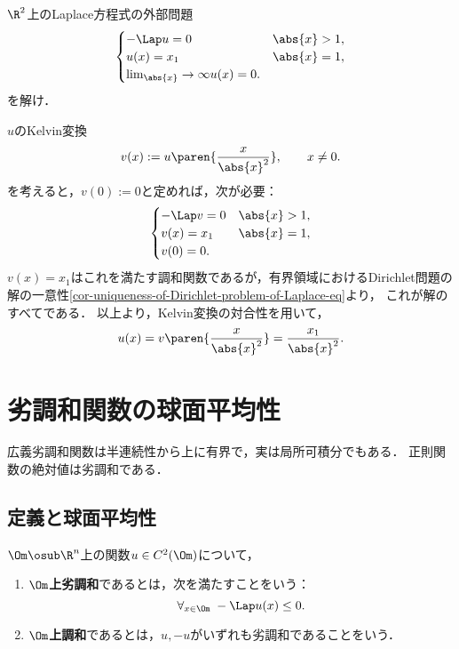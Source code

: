 \documentclass[uplatex,dvipdfmx]{jsreport}
\begin{document}
\begin{problem}
    $\R^2$上のLaplace方程式の外部問題
    \[\begin{cases}
        -\Lap u=0&\abs{x}>1,\\
        u(x)=x_1&\abs{x}=1,\\
        \lim_{\abs{x}}\to\infty u(x)=0.
    \end{cases}\]
    を解け．
\end{problem}
\begin{Proof}
    $u$のKelvin変換
    \[v(x):=u\paren{\frac{x}{\abs{x}^2}},\qquad x\ne0.\]
    を考えると，$v(0):=0$と定めれば，次が必要：
    \[\begin{cases}
        -\Lap v=0&\abs{x}>1,\\
        v(x)=x_1&\abs{x}=1,\\
        v(0)=0.
    \end{cases}\]
    $v(x)=x_1$はこれを満たす調和関数であるが，有界領域におけるDirichlet問題の解の一意性\ref{cor-uniqueness-of-Dirichlet-problem-of-Laplace-eq}より，
    これが解のすべてである．
    以上より，Kelvin変換の対合性を用いて，
    \[u(x)=v\paren{\frac{x}{\abs{x}^2}}=\frac{x_1}{\abs{x}^2}.\]
\end{Proof}

\section{劣調和関数の球面平均性}

\begin{tcolorbox}[colframe=ForestGreen, colback=ForestGreen!10!white,breakable,colbacktitle=ForestGreen!40!white,coltitle=black,fonttitle=\bfseries\sffamily,
title=]
    広義劣調和関数は半連続性から上に有界で，実は局所可積分でもある．
    正則関数の絶対値は劣調和である．
\end{tcolorbox}

\subsection{定義と球面平均性}

\begin{definition}
    $\Om\osub\R^n$上の関数$u\in C^2(\Om)$について，
    \begin{enumerate}
        \item \textbf{$\Om$上劣調和}であるとは，次を満たすことをいう：
        \[\forall_{x\in\Om}\;-\Lap u(x)\le 0.\]
        \item \textbf{$\Om$上調和}であるとは，$u,-u$がいずれも劣調和であることをいう．
    \end{enumerate}
\end{definition}
\end{document}
